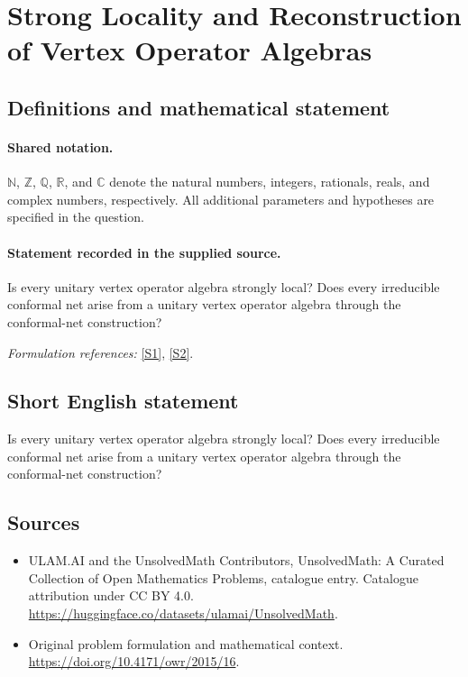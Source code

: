 \documentclass[11pt]{article}
\newcommand{\sref}[2]{\hyperlink{source:#1:#2}{[S#2]}}
\begin{document}
\section{Strong Locality and Reconstruction of Vertex Operator Algebras}\label{statement}

\subsection{Definitions and mathematical statement}

\paragraph{Shared notation.}$\mathbb N$, $\mathbb Z$, $\mathbb Q$, $\mathbb R$, and $\mathbb C$ denote the natural numbers, integers, rationals, reals, and complex numbers, respectively. All additional parameters and hypotheses are specified in the question.


\paragraph{Statement recorded in the supplied source.}
Is every unitary vertex operator algebra strongly local? Does every irreducible conformal net arise from a unitary vertex operator algebra through the conformal-net construction?
\par\smallskip\textit{Formulation references:} \sref{statement}{1}, \sref{statement}{2}.
\subsection{Short English statement}
Is every unitary vertex operator algebra strongly local? Does every irreducible conformal net arise from a unitary vertex operator algebra through the conformal-net construction?
\subsection{Sources}
\begin{itemize}
\item[\hypertarget{source:statement:1}{S1}] ULAM.AI and the UnsolvedMath Contributors, UnsolvedMath: A Curated Collection of Open Mathematics Problems, catalogue entry. Catalogue attribution under CC BY 4.0.
\url{https://huggingface.co/datasets/ulamai/UnsolvedMath}.
\item[\hypertarget{source:statement:2}{S2}] Original problem formulation and mathematical context.
\url{https://doi.org/10.4171/owr/2015/16}.
\end{itemize}
\label{end:statement}
\end{document}
